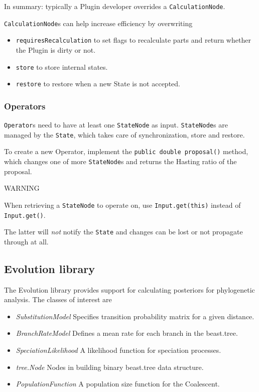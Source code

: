 \documentclass{article}
\begin{document}
In summary: typically a Plugin developer overrides a {\tt CalculationNode}.

{\tt CalculationNode}s can help increase efficiency by overwriting
\begin{itemize}
\item {\tt requiresRecalculation} to set flags to recalculate parts and return
whether the Plugin is dirty or not.
\item {\tt store} to store internal states.
\item {\tt restore} to restore when a new State is not accepted.
\end{itemize}

\subsubsection{Operators\label{ssec.oper}}

{\tt Operator}s need to have at least one {\tt StateNode} as input.
{\tt StateNode}s are managed by the {\tt State}, which takes care of synchronization,
store and restore.

To create a new Operator, implement the {\tt public double proposal()} method, 
which changes one of more {\tt StateNode}s and returns the Hasting ratio of the proposal.

\begin{center}{\huge WARNING}\end{center}

When retrieving a {\tt StateNode} to operate on, use {\tt Input.get(this)} instead of
{\tt Input.get()}. 

The latter will {\em not} notify the {\tt State} and changes can be lost or not
propagate through at all.


\subsection{Evolution library\label{ssec.evo}}

The Evolution library provides support for calculating posteriors for
phylogenetic analysis. The classes of interest are
\begin{itemize}
\item{\em SubstitutionModel} Specifies transition probability matrix for a given distance.
\item{\em BranchRateModel} Defines a mean rate for each branch in the beast.tree.
\item{\em SpeciationLikelihood} A likelihood function for speciation processes.
\item{\em tree.Node} Nodes in building binary beast.tree data structure.
\item{\em PopulationFunction} A population size function for the Coalescent.
\end{itemize}
\end{document}

